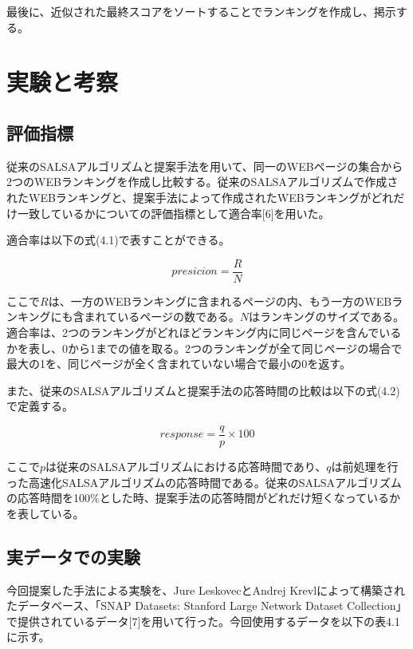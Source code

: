 \documentclass[a4paper,11pt]{jreport}
\begin{document}
最後に、近似された最終スコアをソートすることでランキングを作成し、掲示する。

\chapter{実験と考察}

\section{評価指標}

従来のSALSAアルゴリズムと提案手法を用いて、同一のWEBページの集合から2つのWEBランキングを作成し比較する。従来のSALSAアルゴリズムで作成されたWEBランキングと、提案手法によって作成されたWEBランキングがどれだけ一致しているかについての評価指標として適合率[6]を用いた。

適合率は以下の式(4.1)で表すことができる。

\begin{equation}
presicion = \frac{R}{N}
\end{equation}

ここで$R$は、一方のWEBランキングに含まれるページの内、もう一方のWEBランキングにも含まれているページの数である。$N$はランキングのサイズである。適合率は、2つのランキングがどれほどランキング内に同じページを含んでいるかを表し、0から1までの値を取る。2つのランキングが全て同じページの場合で最大の1を、同じページが全く含まれていない場合で最小の0を返す。

また、従来のSALSAアルゴリズムと提案手法の応答時間の比較は以下の式(4.2)で定義する。

\begin{equation}
response = \frac{q}{p} \times 100
\end{equation}

ここで$p$は従来のSALSAアルゴリズムにおける応答時間であり、$q$は前処理を行った高速化SALSAアルゴリズムの応答時間である。従来のSALSAアルゴリズムの応答時間を100$\%$とした時、提案手法の応答時間がどれだけ短くなっているかを表している。

\section{実データでの実験}

今回提案した手法による実験を、Jure LeskovecとAndrej Krevlによって構築されたデータベース、「SNAP Datasets: Stanford Large Network Dataset Collection」で提供されているデータ[7]を用いて行った。今回使用するデータを以下の表4.1に示す。
\end{document}
